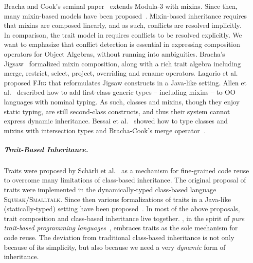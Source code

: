 Bracha and Cook's seminal paper~\cite{bracha1990mixin} extends Modula-3 with
mixins. Since then, many mixin-based models have been proposed~\cite{flatt1998classes,bono1999core, ancona2003jam}.
Mixin-based inheritance requires that mixins are composed linearly, and
as such, conflicts are resolved implicitly. In comparison, the trait
model in \name requires conflicts to be resolved explicitly. We want to emphasize
that conflict detection is essential in expressing composition operators
for Object Algebras, without running into ambiguities. Bracha's
Jigsaw~\cite{bracha1992programming} formalized mixin composition, along with a rich
trait algebra including merge, restrict, select, project, overriding and rename operators.
Lagorio et al.~\cite{LAGORIO201286} proposed \textsc{FJig} that reformulates Jigsaw constructs
in a Java-like setting.
Allen et al.~\cite{DBLP:conf/oopsla/AllenBC03} described how to add first-class generic
types -- including mixins -- to OO languages with nominal typing.
As such, classes and mixins, though they enjoy static typing, are still second-class
constructs, and thus their system cannot express dynamic inheritance. Bessai et
al.~\cite{DBLP:journals/corr/BessaiDDCd15} showed how to type classes and mixins
with intersection types and Bracha-Cook's merge operator~\cite{bracha1990mixin}.


\subparagraph{Trait-Based Inheritance.}


Traits were proposed by Sch{\"a}rli et al.~\cite{scharli2003traits, Ducasse_2006} as a mechanism
for fine-grained code reuse to overcome many limitations of class-based inheritance. The original proposal
of traits were implemented in the dynamically-typed class-based language \textsc{Squeak/Smalltalk}.
Since then various formalizations of traits in a Java-like (statically-typed) setting
have been proposed~\cite{fisher2004typed,scharli2003traitsformal,chai_trait, JOT:issue_2006_05/article4}.
In most of the above proposals, trait composition and class-based inheritance live together.
\name, in the spirit of \textit{pure trait-based programming languages}~\cite{BETTINI2013521, BETTINI2017419}, embraces
traits as the sole mechanism for code reuse.
The deviation from traditional class-based inheritance is not only
because of its simplicity, but also because we need a very \emph{dynamic} form
of inheritance.

